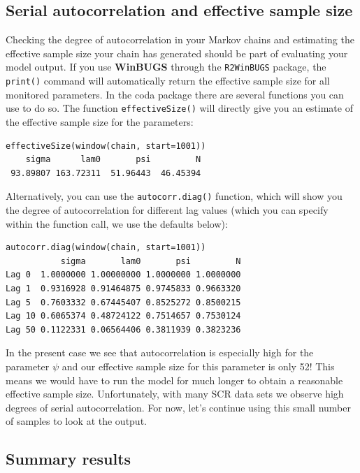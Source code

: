 \subsection{Serial autocorrelation and effective sample size}

Checking the degree of autocorrelation in your Markov chains and 
estimating the effective sample size your chain has generated should 
be part of evaluating your model output. If you use {\bf WinBUGS}
 through the \mbox{\tt R2WinBUGS} package, the \verb#print()# command 
 will automatically return the effective sample size for all monitored 
 parameters. In the coda package there are several functions you can use 
 to do so. The function \verb#effectiveSize()# will directly give you an estimate 
 of the effective sample size for the parameters:
\begin{verbatim}
effectiveSize(window(chain, start=1001))
    sigma      lam0       psi         N 
 93.89807 163.72311  51.96443  46.45394 
\end{verbatim}

Alternatively, you can use the \verb#autocorr.diag()# function, which will show you the degree of autocorrelation for different lag values (which you can specify within the function call, we use the defaults below):
\begin{verbatim}
autocorr.diag(window(chain, start=1001))
           sigma       lam0       psi         N
Lag 0  1.0000000 1.00000000 1.0000000 1.0000000
Lag 1  0.9316928 0.91464875 0.9745833 0.9663320
Lag 5  0.7603332 0.67445407 0.8525272 0.8500215
Lag 10 0.6065374 0.48724122 0.7514657 0.7530124
Lag 50 0.1122331 0.06564406 0.3811939 0.3823236
\end{verbatim}
In the present case we see that autocorrelation is especially high for the 
parameter $\psi$ and our effective sample size for this parameter is 
only 52! 
This means we would have to run the model for much longer to 
obtain a reasonable effective sample size. Unfortunately, with many SCR data sets we observe high degrees of serial autocorrelation. For now, let's continue using this small number of samples to look at the output.


\subsection{Summary results}
\label{mcmc.sec.mcmcsummary}


